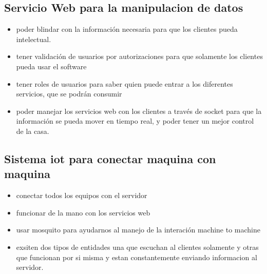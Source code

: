 \subsection{Servicio Web para la manipulacion de datos}
\begin{itemize}
\item poder blindar con la información necesaria para que los clientes pueda intelectual.
\item tener validación de usuarios por autorizaciones para que solamente los clientes pueda usar el software
\item tener roles de usuarios para saber quien puede entrar a los diferentes servicios, que se podrán consumir
\item poder manejar los servicios web con los clientes a través de socket para que la información se pueda mover en tiempo real, y poder tener un mejor control de la casa.
\end{itemize}
\subsection{Sistema iot para conectar maquina con maquina}
\begin{itemize}
\item conectar todos los equipos con el servidor
\item funcionar de la mano con los servicios web
\item usar mosquito para ayudarnos al manejo de la interación machine to machine
\item exsiten dos tipos de entidades una que escuchan al clientes solamente y otras que funcionan por si misma y estan constantemente enviando informacion al servidor.
\end{itemize}

